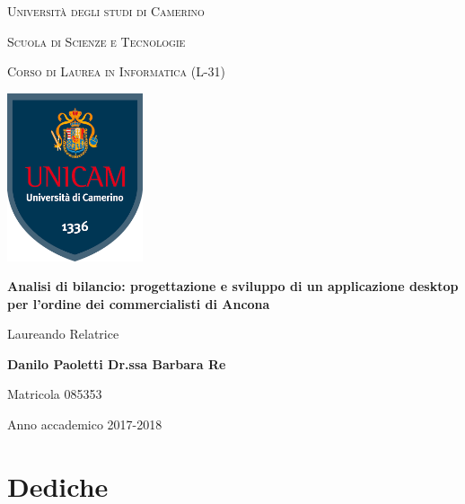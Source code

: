 \documentclass[12pt,a4paper]{report}
\begin{document}
    \begin{titlepage}
    
    	\centering
    	{\scshape\LARGE Università degli studi di Camerino \par}
    	
    	\vspace{0.5cm}
    	{\scshape\Large Scuola di Scienze e Tecnologie\par}
    	
    	\vspace{0.5cm}
    	{\scshape Corso di Laurea in Informatica (L-31)\par}
    	
    	\vspace{1cm}
    	\includegraphics[width=4cm]{unicam-scudo.png}\par\vspace{1cm}
    	{\huge\bfseries Analisi di bilancio: progettazione e sviluppo di un applicazione desktop per l'ordine dei commercialisti di Ancona\par}
    	\vspace{2cm}
    	
    	{Laureando \hfill Relatrice \par}
    	{\bfseries \large Danilo Paoletti \hfill Dr.ssa Barbara Re \par}
    	{\small Matricola 085353 \hfill}
    
    	\vfill
    	
    	{\large Anno accademico 2017-2018\par}
    	
    \end{titlepage}
    
    \thispagestyle{empty}
    \clearpage\null\newpage
    
    \setcounter{page}{3}
    
    \chapter*{Dediche}
    
\end{document}
